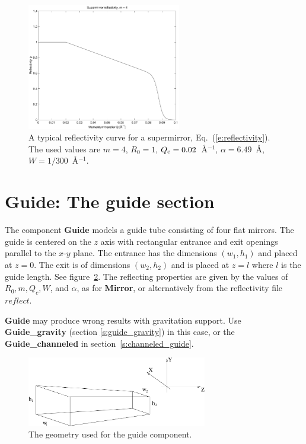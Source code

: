 \begin{figure}
  \begin{center}
    \includegraphics[width=0.6\textwidth]{figures/supermirror}
  \end{center}
\caption{A typical reflectivity curve for a supermirror,
Eq.~(\protect\ref{e:reflectivity}). The used values are
$ m=4$, $R_0=1$, $Q_{\rm c} = 0.02$~\AA$^{-1}$, $\alpha = 6.49$~\AA,
$ W=1/300$~\AA$^{-1}$.
}
\label{f:reflectivity}
\end{figure}

\newpage

\section{Guide: The guide section}


The component {\bf Guide}
models a guide tube consisting of four flat mirrors. The
guide is centered on the $z$ axis with rectangular entrance and exit
openings parallel to the $x$-$y$ plane. The entrance has the dimensions
$(w_1,h_1)$ and placed at $z=0$. The exit is of dimensions $(w_2,h_2)$
and is placed at $z=l$ where $l$ is the guide length. See
figure~\ref{f:guide}.
The reflecting properties are given by the values of
$R_0, m, Q_c, W$, and $\alpha$, as for {\bf Mirror}, or alternatively from the reflectivity file $reflect$.

{\bf Guide} may produce wrong results with gravitation support.
Use {\bf Guide\_gravity} (section \ref{s:guide_gravity}) in this case,
or the {\bf Guide\_channeled}
in section~\ref{s:channeled_guide}.

\begin{figure}
  \begin{center}
    \includegraphics[width=0.7\textwidth]{figures/guide1}
  \end{center}
\caption{The geometry used for the guide component.}
\label{f:guide}
\end{figure}

